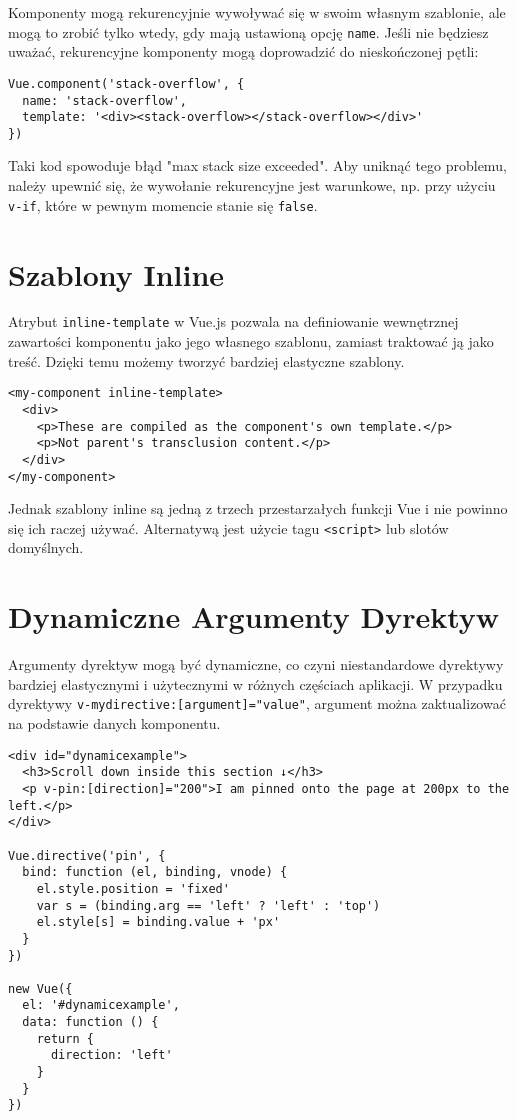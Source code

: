 \documentclass[a4paper,12pt]{article}
\begin{document}
Komponenty mogą rekurencyjnie wywoływać się w swoim własnym szablonie, ale mogą to zrobić tylko wtedy, gdy mają ustawioną opcję \texttt{name}. Jeśli nie będziesz uważać, rekurencyjne komponenty mogą doprowadzić do nieskończonej pętli:

\begin{lstlisting}
Vue.component('stack-overflow', {
  name: 'stack-overflow',
  template: '<div><stack-overflow></stack-overflow></div>'
})
\end{lstlisting}

Taki kod spowoduje błąd "max stack size exceeded". Aby uniknąć tego problemu, należy upewnić się, że wywołanie rekurencyjne jest warunkowe, np. przy użyciu \texttt{v-if}, które w pewnym momencie stanie się \texttt{false}.

\section{Szablony Inline}

Atrybut \texttt{inline-template} w Vue.js pozwala na definiowanie wewnętrznej zawartości komponentu jako jego własnego szablonu, zamiast traktować ją jako treść. Dzięki temu możemy tworzyć bardziej elastyczne szablony.

\begin{lstlisting}
<my-component inline-template>
  <div>
    <p>These are compiled as the component's own template.</p>
    <p>Not parent's transclusion content.</p>
  </div>
</my-component>
\end{lstlisting}

Jednak szablony inline są jedną z trzech przestarzałych funkcji Vue i nie powinno się ich raczej używać. Alternatywą jest użycie tagu \texttt{<script>} lub slotów domyślnych.

\section{Dynamiczne Argumenty Dyrektyw}

Argumenty dyrektyw mogą być dynamiczne, co czyni niestandardowe dyrektywy bardziej elastycznymi i użytecznymi w różnych częściach aplikacji. W przypadku dyrektywy \texttt{v-mydirective:[argument]="value"}, argument można zaktualizować na podstawie danych komponentu.

\begin{lstlisting}
<div id="dynamicexample">
  <h3>Scroll down inside this section ↓</h3>
  <p v-pin:[direction]="200">I am pinned onto the page at 200px to the left.</p>
</div>

Vue.directive('pin', {
  bind: function (el, binding, vnode) {
    el.style.position = 'fixed'
    var s = (binding.arg == 'left' ? 'left' : 'top')
    el.style[s] = binding.value + 'px'
  }
})

new Vue({
  el: '#dynamicexample',
  data: function () {
    return {
      direction: 'left'
    }
  }
})
\end{lstlisting}
\end{document}
